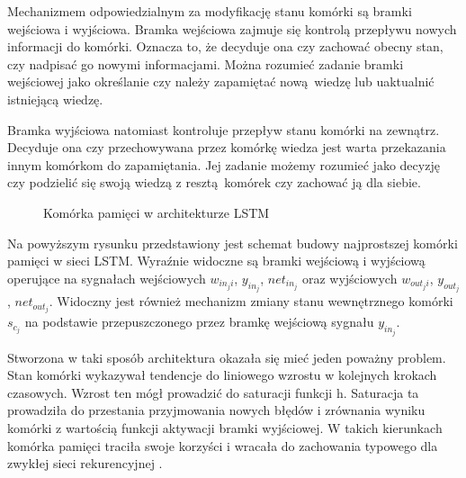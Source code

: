 \documentclass[10pt,a4paper]{article}
\begin{document}
Mechanizmem odpowiedzialnym za modyfikację stanu komórki są bramki wejściowa i wyjściowa. Bramka wejściowa zajmuje się kontrolą przepływu nowych informacji do komórki. Oznacza to, że decyduje ona czy zachować obecny stan, czy nadpisać go nowymi informacjami. Można rozumieć zadanie bramki wejściowej jako określanie czy należy zapamiętać nową wiedzę lub uaktualnić istniejącą wiedzę. 

Bramka wyjściowa natomiast kontroluje przepływ stanu komórki na zewnątrz. Decyduje ona czy przechowywana przez komórkę wiedza jest warta przekazania innym komórkom do zapamiętania. Jej zadanie możemy rozumieć jako decyzję czy podzielić się swoją wiedzą z resztą komórek czy zachować ją dla siebie. 

\begin{figure}[!ht]
	\centering
	\caption{Komórka pamięci w architekturze LSTM}
\end{figure}
\FloatBarrier

Na powyższym rysunku przedstawiony jest schemat budowy najprostszej komórki pamięci w sieci LSTM. Wyraźnie widoczne są bramki wejściową i wyjściową operujące na sygnałach wejściowych $w_{in_ji}$, $y_{in_j}$, $net_{in_j}$ oraz wyjściowych ${w_{out_ji}}$, $y_{out_j}$, $net_{out_j}$. Widoczny jest również mechanizm zmiany stanu wewnętrznego komórki $s_{c_j}$ na podstawie przepuszczonego przez bramkę wejściową sygnału $y_{in_j}$.

Stworzona w taki sposób architektura okazała się mieć jeden poważny problem. Stan komórki wykazywał tendencje do liniowego wzrostu w kolejnych krokach czasowych. Wzrost ten mógł prowadzić do saturacji funkcji h. Saturacja ta prowadziła do przestania przyjmowania nowych błędów i zrównania wyniku komórki z wartością funkcji aktywacji bramki wyjściowej. W takich kierunkach komórka pamięci traciła swoje korzyści i wracała do zachowania typowego dla zwykłej sieci rekurencyjnej \cite{gers2000learning}.
\end{document}
